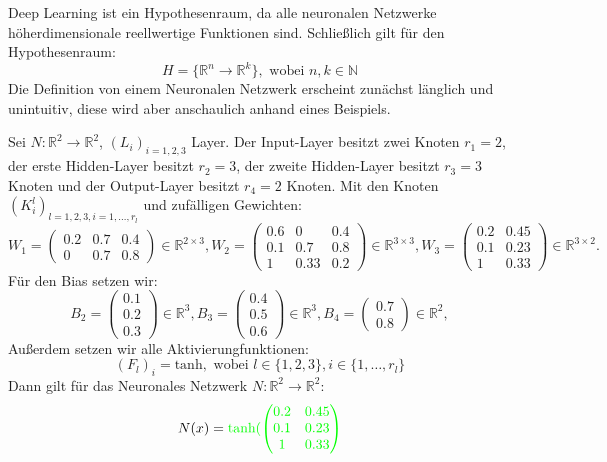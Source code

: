 \documentclass[12pt,letterpaper,ngerman]{article}
\begin{document}
Deep Learning ist ein Hypothesenraum, da alle neuronalen Netzwerke 
höherdimensionale reellwertige Funktionen sind. Schließlich gilt für den
Hypothesenraum:
\[
  H = \{\mathbb{R}^n \to \mathbb{R}^k\}, \text{ wobei } n,k \in \mathbb{N}
\]
Die Definition von einem Neuronalen Netzwerk erscheint zunächst länglich und unintuitiv, diese
wird aber anschaulich anhand eines Beispiels.
\begin{example}
  Sei $N: \mathbb{R}^2 \to \mathbb{R}^2$, $(L_i)_{i=1,2,3}$ Layer.
  Der Input-Layer besitzt zwei Knoten $r_1 = 2$, der erste
  Hidden-Layer besitzt $r_2 = 3$, der zweite Hidden-Layer besitzt
  $r_3 = 3$ Knoten und der Output-Layer besitzt $r_4 = 2$ Knoten.
  Mit den Knoten $(K^l_i)_{l=1,2,3, i = 1, \dots, r_l}$ und zufälligen
  Gewichten:
  \[
    W_1 = \begin{pmatrix} 0.2 & 0.7 & 0.4 \\ 0 & 0.7 & 0.8 \end{pmatrix} 
    \in \mathbb{R}^{2 \times 3},
    W_2 = \begin{pmatrix} 0.6 & 0 & 0.4 \\ 0.1 & 0.7 & 0.8 \\ 1 & 0.33 & 0.2 \end{pmatrix}
    \in \mathbb{R}^{3 \times 3},
    W_3 = \begin{pmatrix} 0.2 & 0.45 \\ 0.1 & 0.23 \\ 1 & 0.33 \end{pmatrix}
    \in \mathbb{R}^{3 \times 2}.
  \]
  Für den Bias setzen wir:
  \[
    B_2 = \begin{pmatrix} 0.1 \\ 0.2 \\ 0.3\end{pmatrix} \in \mathbb{R}^3,
    B_3 = \begin{pmatrix} 0.4 \\ 0.5 \\ 0.6\end{pmatrix} \in \mathbb{R}^3,
    B_4 = \begin{pmatrix} 0.7 \\ 0.8 \end{pmatrix} \in \mathbb{R}^2,
  \]
  Außerdem setzen wir alle Aktivierungfunktionen:
  \[
    (F_{l})_i = \text{tanh}, \text{ wobei } l \in \{ 1, 2, 3\},
      i \in \{1, \dots, r_l\}
  \]
  Dann gilt für das Neuronales Netzwerk $N: \mathbb{R}^2 \to \mathbb{R}^2$:
  \[
    N(x) = 
    {\color{green}
    \text{tanh}(\begin{pmatrix} 0.2 & 0.45 \\ 0.1 & 0.23 \\ 1 & 0.33 \end{pmatrix}
}\]
\end{example}
\end{document}
